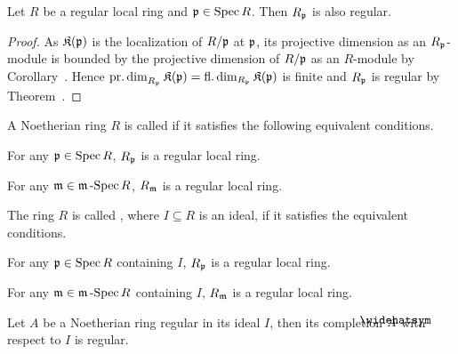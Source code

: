 \documentclass[a4paper,parskip=half,numbers=enddot, DIV=12]{scrreprt}
\begin{document}
\begin{cor}[Serre]
	Let $R$ be a regular local ring and $\mathfrak{p}\in\operatorname{Spec} R$. Then $R_{\mathfrak{p}}$ is also regular.
\end{cor}
\begin{proof}
	As $\mathfrak{K}(\mathfrak{p})$ is the localization of $R/\mathfrak{p}$ at $\mathfrak{p}$, its projective dimension as an $R_{\mathfrak{p}}$-module is bounded by the projective dimension of $R/\mathfrak{p}$ as an $R$-module by Corollary~. Hence $\operatorname{pr.dim}_{R_{\mathfrak{p}}}\mathfrak{K}(\mathfrak{p})=\operatorname{fl.dim}_{R_{\mathfrak{p}}}\mathfrak{K}(\mathfrak{p})$ is finite and $R_{\mathfrak{p}}$ is regular by Theorem~.
\end{proof}
\begin{defi}
	\begin{alphanumerate}
		\item A Noetherian ring $R$ is called  if it satisfies the following equivalent conditions.
		\begin{alphanumerate}
			\item[\itememph{\alpha}] For any $\mathfrak{p}\in\operatorname{Spec} R$, $R_{\mathfrak{p}}$ is a regular local ring.
			\item[\itememph{\beta}] For any $\mathfrak{m}\in\mathfrak{m}\operatorname{-Spec} R$, $R_{\mathfrak{m}}$ is a regular local ring.
		\end{alphanumerate}
		\item The ring $R$ is called , where $I\subseteq R$ is an ideal, if it satisfies the equivalent conditions.
		\begin{alphanumerate}
			\item[\itememph{\alpha}] For any $\mathfrak{p}\in\operatorname{Spec} R$ containing $I$, $R_{\mathfrak{p}}$ is a regular local ring.
			\item[\itememph{\beta}] For any $\mathfrak{m}\in\mathfrak{m}\operatorname{-Spec} R$ containing $I$, $R_{\mathfrak{m}}$ is a regular local ring.
		\end{alphanumerate}
	\end{alphanumerate}
\end{defi}
\begin{prop}
	Let $A$ be a Noetherian ring regular in its ideal $I$, then its completion $\roof{A}$ with respect to $I$ is regular.
\end{prop}
\end{document}
